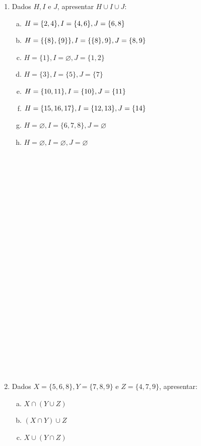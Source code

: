 \documentclass[a4paper,14pt]{article}
\begin{document}
\begin{multicols}{2}
\begin{enumerate}
    			\item Dados $H, I$ e $J$, apresentar $H \cup I \cup J$:
    			\begin{enumerate}[a)]
    				\item $H = \{2, 4\}, I = \{4, 6\}, \\ J = \{6, 8\}$ 
    				\item $H = \{\{8\},\{9\}\}, \\ I = \{\{8\}, 9\}, J = \{8, 9\}$
    				\item $H = \{1\}, I = \varnothing, J = \{1, 2\}$
    				\item $H = \{3\}, I = \{5\}, J = \{7\}$
    				\item $H = \{10, 11\}, I = \{10\}, \\ J = \{11\}$
    				\item $H = \{15, 16, 17\}, \\ I = \{12, 13\}, J = \{14\}$
    				\item $H = \varnothing, I = \{6, 7, 8\}, J = \varnothing$
    				\item $H = \varnothing, I = \varnothing, J = \varnothing$ \\\\\\\\\\\\\\\\\\\\\\\\\\\\\\\\\\\\\\\\\\\\\\\\
    			\end{enumerate}
    			\item Dados $X = \{5, 6, 8\}, Y = \{7, 8, 9\}$ e $Z = \{4, 7, 9\}$, apresentar:
    			\begin{enumerate}[a)]
    				\item $X \cap (Y \cup Z)$
    				\item $(X \cap Y) \cup Z$
    				\item $X \cup (Y \cap Z)$

\end{enumerate}
\end{enumerate}
\end{multicols}
\end{document}
